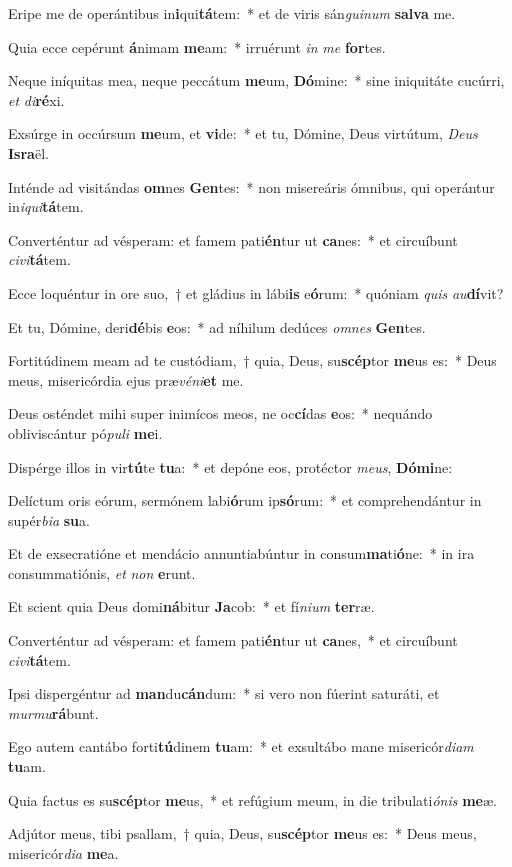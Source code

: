 \item Eripe me de operántibus in\textbf{i}qui\textbf{tá}tem:~* et de viris sán\textit{gui}\textit{num} \textbf{sal}\textbf{va} me.
\item Quia ecce cepérunt \textbf{á}nimam \textbf{me}am:~* irruérunt \textit{in} \textit{me} \textbf{for}tes.
\item Neque iníquitas mea, neque peccátum \textbf{me}um, \textbf{Dó}mine:~* sine iniquitáte cucúrri, \textit{et} \textit{di}\textbf{ré}xi.
\item Exsúrge in occúrsum \textbf{me}um, et \textbf{vi}de:~* et tu, Dómine, Deus virtútum, \textit{De}\textit{us} \textbf{Is}\textbf{ra}ël.
\item Inténde ad visitándas \textbf{om}nes \textbf{Gen}tes:~* non misereáris ómnibus, qui operántur in\textit{i}\textit{qui}\textbf{tá}tem.
\item Converténtur ad vésperam: et famem pati\textbf{én}tur ut \textbf{ca}nes:~* et circuíbunt \textit{ci}\textit{vi}\textbf{tá}tem.
\item Ecce loquéntur in ore suo,~† et gládius in lábi\textbf{is} e\textbf{ó}rum:~* quóniam \textit{quis} \textit{au}\textbf{dí}vit?
\item Et tu, Dómine, deri\textbf{dé}bis \textbf{e}os:~* ad níhilum dedúces \textit{om}\textit{nes} \textbf{Gen}tes.
\item Fortitúdinem meam ad te custódiam,~† quia, Deus, su\textbf{scép}tor \textbf{me}us es:~* Deus meus, misericórdia ejus præ\textit{vé}\textit{ni}\textbf{et} me.
\item Deus osténdet mihi super inimícos meos, ne oc\textbf{cí}das \textbf{e}os:~* nequándo obliviscántur pó\textit{pu}\textit{li} \textbf{me}i.
\item Dispérge illos in vir\textbf{tú}te \textbf{tu}a:~* et depóne eos, protéctor \textit{me}\textit{us}, \textbf{Dó}\textbf{mi}ne:
\item Delíctum oris eórum, sermónem labi\textbf{ó}rum ip\textbf{só}rum:~* et comprehendántur in supér\textit{bi}\textit{a} \textbf{su}a.
\item Et de exsecratióne et mendácio annuntiabúntur in consum\textbf{ma}ti\textbf{ó}ne:~* in ira consummatiónis, \textit{et} \textit{non} \textbf{e}runt.
\item Et scient quia Deus domi\textbf{ná}bitur \textbf{Ja}cob:~* et fí\textit{ni}\textit{um} \textbf{ter}ræ.
\item Converténtur ad vésperam: et famem pati\textbf{én}tur ut \textbf{ca}nes,~* et circuíbunt \textit{ci}\textit{vi}\textbf{tá}tem.
\item Ipsi dispergéntur ad \textbf{man}du\textbf{cán}dum:~* si vero non fúerint saturáti, et \textit{mur}\textit{mu}\textbf{rá}bunt.
\item Ego autem cantábo forti\textbf{tú}dinem \textbf{tu}am:~* et exsultábo mane misericór\textit{di}\textit{am} \textbf{tu}am.
\item Quia factus es su\textbf{scép}tor \textbf{me}us,~* et refúgium meum, in die tribulati\textit{ó}\textit{nis} \textbf{me}æ.
\item Adjútor meus, tibi psallam,~† quia, Deus, su\textbf{scép}tor \textbf{me}us es:~* Deus meus, misericór\textit{di}\textit{a} \textbf{me}a.
